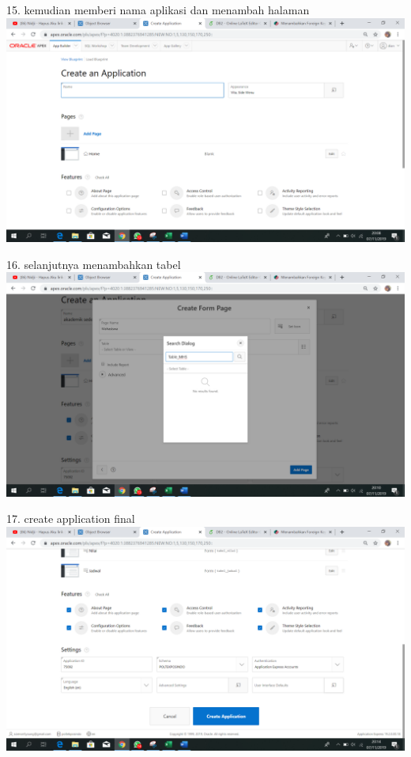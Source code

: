 \documentclass{article}
\begin{document}
\item 15. kemudian memberi nama aplikasi dan menambah halaman\\

\includegraphics[width=15cm\textwidth]{figure/addpg.png}

\item 16. selanjutnya menambahkan tabel\\

\includegraphics[width=15cm\textwidth]{figure/addtabel.png}

\item 17. create application final\\
\includegraphics[width=15cm\textwidth]{figure/createappfinal.png}\\
\end{document}
